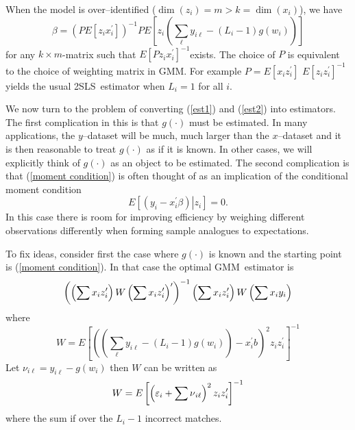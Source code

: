 \documentclass[12pt]{article}
\begin{document}
When the model is over--identified ($\dim \left( z_{i}\right) =m>k=\dim
\left( x_{i}\right) $), we have%
\begin{equation}
\beta =\left( PE\left[ z_{i}x_{i}^{\prime }\right] \right) ^{-1}PE\left[
z_{i}\left( \sum_{\ell }y_{i\ell }-\left( L_{i}-1\right) g\left(
w_{i}\right) \right) \right]  \label{est2}
\end{equation}%
for any $k\times m$-matrix such that $E\left[ Pz_{i}x_{i}^{\prime }\right]
^{-1}$exists. The choice of $P$ is equivalent to the choice of weighting
matrix in GMM. For example $P=E\left[ x_{i}z_{i}^{\prime }\right] $ $E\left[
z_{i}z_{i}^{\prime }\right] ^{-1}$ yields the usual 2SLS\ estimator when $%
L_{i}=1$ for all $i$.

We now turn to the problem of converting (\ref{est1}) and (\ref{est2}) into
estimators. The first complication in this is that $g\left( \cdot \right) $
must be estimated. In many applications, the $y$--dataset will be much, much
larger than the $x$--dataset and it is then reasonable to treat $g\left(
\cdot \right) $ as if it is known. In other cases, we will explicitly think
of $g\left( \cdot \right) $ as an object to be estimated. The second
complication is that (\ref{moment condition}) is often thought of as an
implication of the conditional moment condition
\begin{equation}
E\left[ \left. \left( y_{i}-x_{i}^{\prime }\beta \right) \right\vert z_{i}%
\right] =0.  \label{cond moment}
\end{equation}%
In this case there is room for improving efficiency by weighing different
observations differently when forming sample analogues to expectations.

To fix ideas, consider first the case where $g\left( \cdot \right) $ is
known and the starting point is (\ref{moment condition}). In that case the
optimal GMM\ estimator is
\begin{equation*}
\left( \left( \mathop{\displaystyle \sum } x_{i}z_{i}^{\prime }\right) W\left( \mathop{\displaystyle \sum }
x_{i}z_{i}^{\prime }\right) ^{\prime }\right) ^{-1}\left( \mathop{\displaystyle \sum }
x_{i}z_{i}^{\prime }\right) W\left( \mathop{\displaystyle \sum } x_{i}y_{i}\right)
\end{equation*}%
where%
\begin{equation*}
W=E\left[ \left( \left( \sum_{\ell }y_{i\ell }-\left( L_{i}-1\right) g\left(
w_{i}\right) \right) -x_{i}^{\prime }b\right) ^{2}z_{i}z_{i}^{\prime }\right]
^{-1}
\end{equation*}%
Let $\nu _{i\ell }=y_{i\ell }-g\left( w_{i}\right) $ then $W$ can be written
as%
\begin{equation*}
W=E\left[ \left( \varepsilon _{i}+\dsum \nu _{i\ell }\right)
^{2}z_{i}z_{i}^{\prime }\right] ^{-1}
\end{equation*}%
where the sum if over the $L_{i}-1$ incorrect matches.
\end{document}
